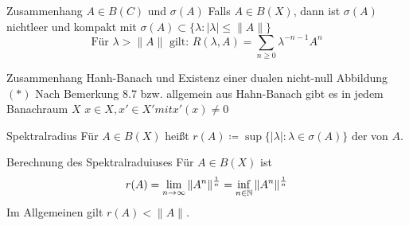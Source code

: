 \begin{karte}{Zusammenhang $A \in B(C)$ und $\sigma(A)$}
	Falls $A \in B(X)$, dann ist $\sigma(A)$ nichtleer und kompakt mit $\sigma(A) \subset \{ \lambda : |\lambda| \leq \| A \| \}$ \\
	\[ \text{Für } \lambda > \| A \| \text{ gilt: } R(\lambda, A) = \sum_{n \geq 0} \lambda^{-n-1} A^{n} \]
\end{karte}

\begin{karte}{Zusammenhang Hanh-Banach und Existenz einer dualen nicht-null Abbildung}
	$(*)$ Nach Bemerkung 8.7 bzw. allgemein aus Hahn-Banach gibt es in jedem Banachraum $X$ $x \in X, x' \in X' mit x'(x) \neq 0$
\end{karte}


\begin{karte}{Spektralradius}
	Für $A \in B(X)$ hei{\ss}t $r(A) \coloneqq \sup \{ | \lambda |: \lambda \in \sigma(A) \}$ der  von $A$.
\end{karte}


\begin{karte}{Berechnung des Spektralraduiuses}
	Für $A \in B(X)$ ist
		\[ r(A) = \lim_{n \rightarrow \infty} \| A^{n} \|^{\frac{1}{n}} = \inf_{n \in \mathbb{N}} \| A^{n} \|^{\frac{1}{n}} \]
		Im Allgemeinen gilt $r(A) < \| A \|$.
\end{karte}